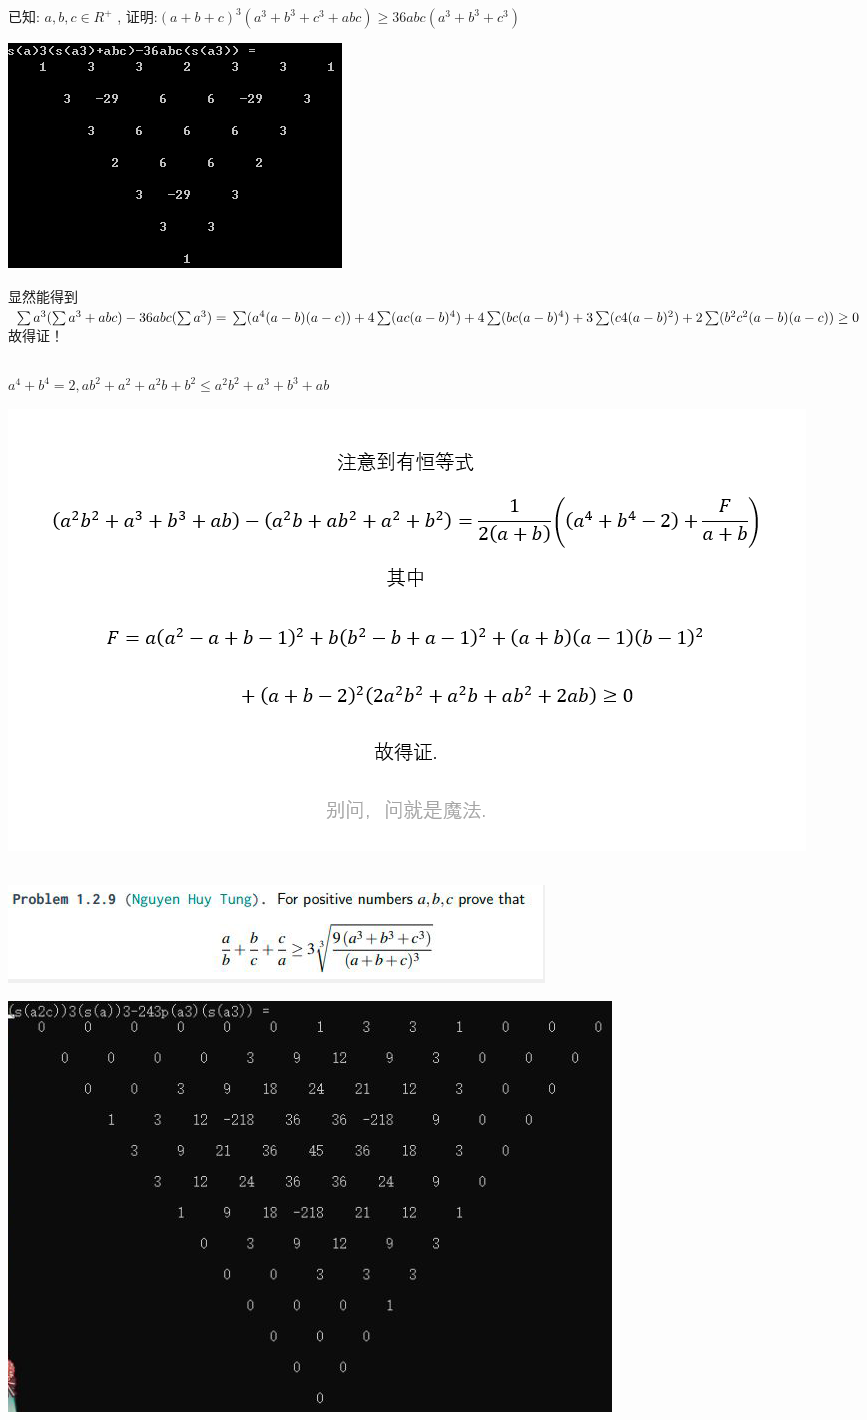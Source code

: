 \documentclass[UTF8]{ctexart}
\begin{document}
\subsection{}
已知:  $ a, b, c \in R^{+} $ , 证明:$ (a+b+c)^{3}(a^{3}+b^{3}+c^{3}+a b c) \geq 36 a b c(a^{3}+b^{3}+c^{3}) $
\begin{center}
	\includegraphics[width=0.5\linewidth]{a34}
\end{center}
显然能得到$\sum a^{3}(\sum a^{3}+abc)-36abc(\sum a^{3})=\\
\sum (a^{4}(a-b)(a-c))+4\sum (ac(a-b)^{4})+4\sum (bc(a-b)^{4})+3\sum (c4(a-b)^{2})+2\sum (b^{2}c^{2}(a-b)(a-c))\ge 0$故得证！
\subsection{}
$ a^4+b^4=2,
ab^2+a^2+a^2b+b^2 \le a^2b^2+a^3+b^3+ab $
\begin{center}
	\includegraphics[width=0.5\linewidth]{a37}
\end{center}

\subsection{}
\begin{center}
	\includegraphics[width=0.5\linewidth]{a35}
\end{center}
\begin{center}
	\includegraphics[width=0.5\linewidth]{a36}
\end{center}
\end{document}
